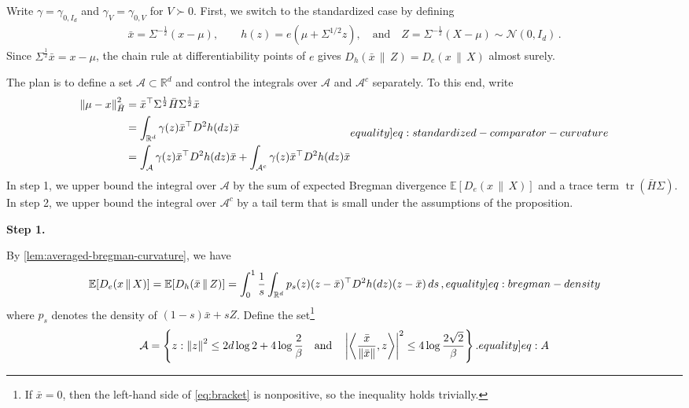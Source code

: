 \documentclass[12pt,cleveref]{jmlr}
\renewenvironment{proof}[1][\proofname]
{\par\noindent{\bfseries\upshape #1\ }}
{\jmlrQED}
\newcommand{\eqlabel}[1]{\label[equality]{#1}}
\newcommand{\proofstepinline}[1]{%
    \par\addvspace{0.6\baselineskip}
    \noindent
    {\normalfont\normalsize\bfseries\color{blue!55!black}Step #1.}\enspace\ignorespaces
}
\newcommand{\R}{\mathbb R}
\newcommand{\E}{\mathbb E}
\newcommand{\N}{\mathcal N}
\newcommand{\tr}{\operatorname{tr}}
\newcommand{\1}{\mathbf 1}
\newcommand{\ip}[2]{\left\langle #1,#2\right\rangle}
\newcommand{\norm}[1]{\left\lVert #1\right\rVert}
\newcommand{\normm}[2]{\left\lVert #1\right\rVert_{#2}}
\begin{document}
\begin{proof}[Proof of \cref{prop:bracket}]
    Write $\gamma=\gamma_{0,I_d}$ and $\gamma_V=\gamma_{0,V}$ for $V\succ0$.
    First, we switch to the standardized case by defining
    \begin{align}
        \bar{x}=\Sigma^{-\frac12}(x-\mu),
        \qquad
        h(z)=e(\mu+\Sigma^{1/2}z),
        \quad\text{and}
        \quad
        Z=\Sigma^{-\frac12}(X - \mu) \sim \N(0,I_d)\,.
    \end{align}
    Since $\Sigma^{\frac12}\bar{x}=x-\mu$, the chain rule at
    differentiability points of $e$ gives
    $D_h(\bar{x}\,\|\,Z)=D_e(x\,\|\,X)$
    almost surely.

    The plan is to define a set $\mathcal A\subset \R^d$ and control the integrals over $\mathcal A$ and $\mathcal A^c$ separately.
    To this end, write
    \begin{align}
        \begin{aligned}
            \normm{\mu-x}{\bar{H}}^2
            & =
            \bar{x}^\top \Sigma^{\frac12}\bar{H}\Sigma^{\frac12}\bar{x}
            \\
            & =
            \int_{\R^d}\gamma(z)\bar{x}^\top D^2h(dz)\bar{x}
            \\
            & =
            \int_{\mathcal A}\gamma(z)\bar{x}^\top D^2h(dz)\bar{x}
            +
            \int_{\mathcal A^c}\gamma(z)\bar{x}^\top D^2h(dz)\bar{x}
        \end{aligned}
        \eqlabel{eq:standardized-comparator-curvature}
    \end{align}
    In step 1, we upper bound the integral over $\mathcal A$ by the sum of expected Bregman divergence $\E[D_e(x\,\|\,X)]$ and a trace term $\tr(\bar{H}\Sigma)$.
    In step 2, we upper bound the integral over $\mathcal A^c$ by a tail term that is small under the assumptions of the proposition.

    \proofstepinline{1}
    By \cref{lem:averaged-bregman-curvature}, we have
    \begin{align}
        \E[D_e(x\,\|\,X)]
        =
        \E[D_h(\bar{x}\,\|\,Z)]
        =
        \int_0^1\frac1s
        \int_{\R^d}
        p_s(z)(z-\bar{x})^\top D^2h(dz)(z-\bar{x})\,ds\,,
        \eqlabel{eq:bregman-density}
    \end{align}
    where $p_s$ denotes the density of $(1-s)\bar{x}+sZ$.
    Define the set\footnote{
        If $\bar{x}=0$, then the left-hand side of \cref{eq:bracket} is nonpositive, so the inequality holds trivially.
    }
    \begin{align}
        \mathcal A=\left\{z:
            \norm{z}^2\leq2d\log2+4\log\frac2\beta
            \quad
            \text{and}
            \quad
            \left|\ip{\frac{\bar{x}}{\norm{\bar{x}}}}{z}\right|^2
            \leq4\log\frac{2\sqrt2}{\beta}
        \right\}.
        \eqlabel{eq:A}
    \end{align}


\end{proof}
\end{document}
